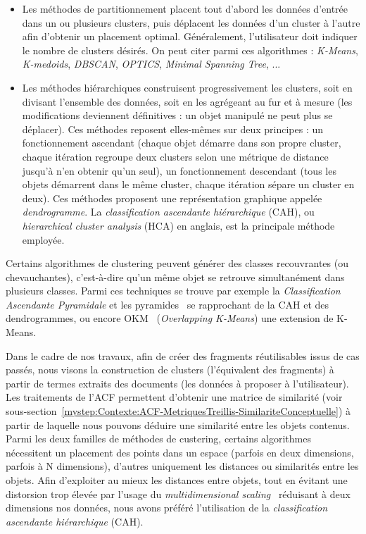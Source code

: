 \begin{itemize}
\item Les méthodes de partitionnement placent tout d'abord les données d'entrée dans un ou plusieurs clusters, puis déplacent les données d'un cluster à l'autre afin d'obtenir un placement optimal.
Généralement, l'utilisateur doit indiquer le nombre de clusters désirés.
On peut citer parmi ces algorithmes : \textit{K-Means}, \textit{K-medoids}, \textit{DBSCAN}, \textit{OPTICS}, \textit{Minimal Spanning Tree}, ...\\

\item Les méthodes hiérarchiques construisent progressivement les clusters, soit en divisant l'ensemble des données, soit en les agrégeant au fur et à mesure (les modifications deviennent définitives : un objet manipulé ne peut plus se déplacer).
Ces méthodes reposent elles-mêmes sur deux principes : un fonctionnement ascendant (chaque objet démarre dans son propre cluster, chaque itération regroupe deux clusters selon une métrique de distance jusqu'à n'en obtenir qu'un seul), un fonctionnement descendant (tous les objets démarrent dans le même cluster, chaque itération sépare un cluster en deux).
Ces méthodes proposent une représentation graphique appelée \textit{dendrogramme}.
La \textit{classification ascendante hiérarchique} (CAH), ou \textit{hierarchical cluster analysis} (HCA) en anglais, est la principale méthode employée.
\end{itemize}

\bigskip

Certains algorithmes de clustering peuvent générer des classes recouvrantes (ou chevauchantes), c'est-à-dire qu'un même objet se retrouve simultanément dans plusieurs classes.
Parmi ces techniques se trouve par exemple la \textit{Classification Ascendante Pyramidale} et les pyramides~\cite{diday1984representation} se rapprochant de la CAH et des dendrogrammes, ou encore OKM~\cite{cleuziou2008extended} (\textit{Overlapping K-Means}) une extension de K-Means.

\bigskip

Dans le cadre de nos travaux, afin de créer des fragments réutilisables issus de cas passés, nous visons la construction de clusters (l'équivalent des fragments) à partir de termes extraits des documents (les données à proposer à l'utilisateur).
Les traitements de l'ACF permettent d'obtenir une matrice de similarité (voir sous-section~\ref{mystep:Contexte:ACF-MetriquesTreillis-SimilariteConceptuelle}) à partir de laquelle nous pouvons déduire une similarité entre les objets contenus.
Parmi les deux familles de méthodes de custering, certains algorithmes nécessitent un placement des points dans un espace (parfois en deux dimensions, parfois à N dimensions), d'autres uniquement les distances ou similarités entre les objets.
Afin d'exploiter au mieux les distances entre objets, tout en évitant une distorsion trop élevée par l'usage du \textit{multidimensional scaling}~\cite{kruskal1978multidimensional}\cite{young1983multidimensional} réduisant à deux dimensions nos données, nous avons préféré l'utilisation de la \textit{classification ascendante hiérarchique} (CAH).

